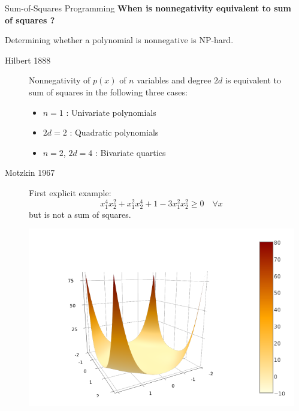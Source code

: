 \documentclass[final]{beamer}
\newlength{\sepwid}
\newlength{\onecolwid}
\begin{document}
\begin{frame}[t,fragile]
\begin{columns}[t]
\begin{column}{\onecolwid}
\begin{block}{Sum-of-Squares Programming}
  \textbf{When is nonnegativity equivalent to sum of squares ?}

  Determining whether a polynomial is nonnegative is \alert{NP-hard}.

    \begin{description}
      \item[Hilbert 1888]
        Nonnegativity of $p(x)$ of $n$ variables and degree $2d$ is equivalent to sum of squares in the following three cases:
        \begin{itemize}
          \item $n = 1$ : Univariate polynomials
          \item $2d = 2$ : Quadratic polynomials
          \item $n = 2$, $2d = 4$ : Bivariate quartics
        \end{itemize}

      \item[Motzkin 1967]
        First explicit example:
        \[ x_1^4x_2^2 + x_1^2x_2^4 + 1 - 3x_1^2x_2^2 \geq 0 \quad \forall x \]
        but is \alert{not} a sum of squares.
        \begin{center}
          \includegraphics[trim=3cm .7cm 6cm 3cm, clip, width=\textwidth]{motzkin.png}
        \end{center}
    \end{description}

  \end{block}

\end{column}

\begin{column}{\sepwid}\end{column} %


\end{columns}
\end{frame}
\end{document}
